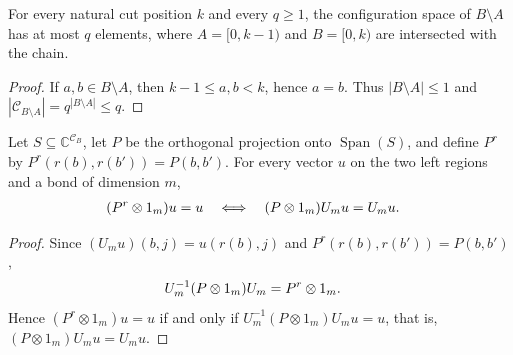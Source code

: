 \begin{lemma}
    \label{thm:chain_gluing_site_dimension}
    \leanok
    For every natural cut position $k$ and every $q\ge1$, the configuration
    space of $B\setminus A$ has at most $q$ elements, where
    $A=\lbrack0,k-1)$ and $B=\lbrack0,k)$ are intersected with the chain.
\end{lemma}
\begin{proof}
    \leanok
    If $a,b\in B\setminus A$, then $k-1\le a,b<k$, hence $a=b$.
    Thus $|B\setminus A|\le1$ and
    $|\mathcal C_{B\setminus A}|=q^{|B\setminus A|}\le q$.
\end{proof}

\begin{lemma}
    \label{thm:chain_gluing_left_projection}
    \leanok
    Let $S\subseteq\mathbb C^{\mathcal C_B}$, let $P$ be the orthogonal
    projection onto $\operatorname{Span}(S)$, and define $P^r$ by
    $P^r(r(b),r(b'))=P(b,b')$. For every vector $u$ on the two left regions
    and a bond of dimension $m$,
    \begin{align}
        (P^r\otimes1_m)u=u
        \quad & \Longleftrightarrow\quad
        (P\otimes1_m)U_m u=U_m u. \notag
    \end{align}
\end{lemma}
\begin{proof}
    \leanok
    Since $(U_m u)(b,j)=u(r(b),j)$ and $P^r(r(b),r(b'))=P(b,b')$,
    \begin{align}
        U_m^{-1}(P\otimes1_m)U_m & =P^r\otimes1_m. \notag
    \end{align}
    Hence $(P^r\otimes1_m)u=u$ if and only if
    $U_m^{-1}(P\otimes1_m)U_m u=u$, that is,
    $(P\otimes1_m)U_m u=U_m u$.
\end{proof}

